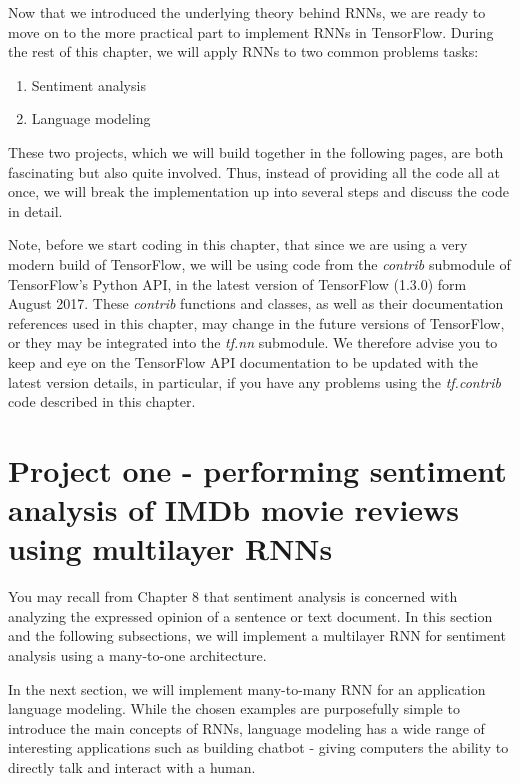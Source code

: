 \documentclass[11pt]{article}
\providecommand{\tightlist}{%
      \setlength{\itemsep}{0pt}\setlength{\parskip}{0pt}}
\begin{document}
    Now that we introduced the underlying theory behind RNNs, we are ready
to move on to the more practical part to implement RNNs in TensorFlow.
During the rest of this chapter, we will apply RNNs to two common
problems tasks:

\begin{enumerate}
\def\labelenumi{\arabic{enumi}.}
\tightlist
\item
  Sentiment analysis
\item
  Language modeling
\end{enumerate}

These two projects, which we will build together in the following pages,
are both fascinating but also quite involved. Thus, instead of providing
all the code all at once, we will break the implementation up into
several steps and discuss the code in detail.

Note, before we start coding in this chapter, that since we are using a
very modern build of TensorFlow, we will be using code from the
\emph{contrib} submodule of TensorFlow's Python API, in the latest
version of TensorFlow (1.3.0) form August 2017. These \emph{contrib}
functions and classes, as well as their documentation references used in
this chapter, may change in the future versions of TensorFlow, or they
may be integrated into the \emph{tf.nn} submodule. We therefore advise
you to keep and eye on the TensorFlow API documentation to be updated
with the latest version details, in particular, if you have any problems
using the \emph{tf.contrib} code described in this chapter.

    \section{Project one - performing sentiment analysis of IMDb movie
reviews using multilayer
RNNs}\label{project-one---performing-sentiment-analysis-of-imdb-movie-reviews-using-multilayer-rnns}

    You may recall from Chapter 8 that sentiment analysis is concerned with
analyzing the expressed opinion of a sentence or text document. In this
section and the following subsections, we will implement a multilayer
RNN for sentiment analysis using a many-to-one architecture.

In the next section, we will implement many-to-many RNN for an
application language modeling. While the chosen examples are
purposefully simple to introduce the main concepts of RNNs, language
modeling has a wide range of interesting applications such as building
chatbot - giving computers the ability to directly talk and interact
with a human.
\end{document}
